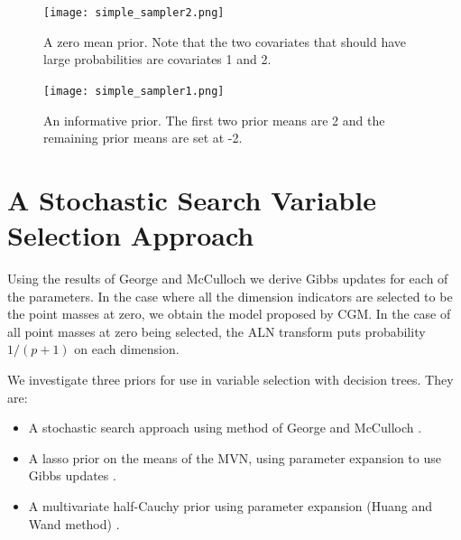 
 \begin{figure}[ht]
\begin{minipage}[b]{0.45\linewidth}
\centering
\texttt{[image: simple\_sampler2.png]}
\caption[Results for the zero mean prior]{A zero mean prior. Note that the two covariates that should have large probabilities are covariates 1 and 2.}
\label{fig:simple_sampler2}
\end{minipage}
\hspace{0.5cm}
\begin{minipage}[b]{0.45\linewidth}
\centering
\texttt{[image: simple\_sampler1.png]}
\caption[Results for the informative prior]{An informative prior. The first two prior means are 2 and the remaining prior means are set at -2.}
\label{fig:simple_sampler1}
\end{minipage}
\end{figure}



\section{A Stochastic Search Variable Selection Approach}\label{sec:PX_1}

Using the results of George and McCulloch we derive Gibbs updates for each of the parameters. In the case where all the dimension indicators are selected to be the point masses at zero, we obtain the model proposed by CGM. In the case of all point masses at zero being selected, the ALN transform puts probability $1/(p+1)$ on each dimension. 


We investigate three priors for use in variable selection with decision trees. They are: 

\begin{itemize}
\item A stochastic search approach using method of George and McCulloch \cite{cui2008empirical,george1993variable}. 
\item A lasso prior on the means of the MVN,  using parameter expansion to use Gibbs updates \cite{park2008bayesian}. 
\item A multivariate half-Cauchy prior using parameter expansion (Huang and Wand method) \cite{huang2013simple,polson2011half,carvalho2010horseshoe,carvalhohandling}. 
\end{itemize}

